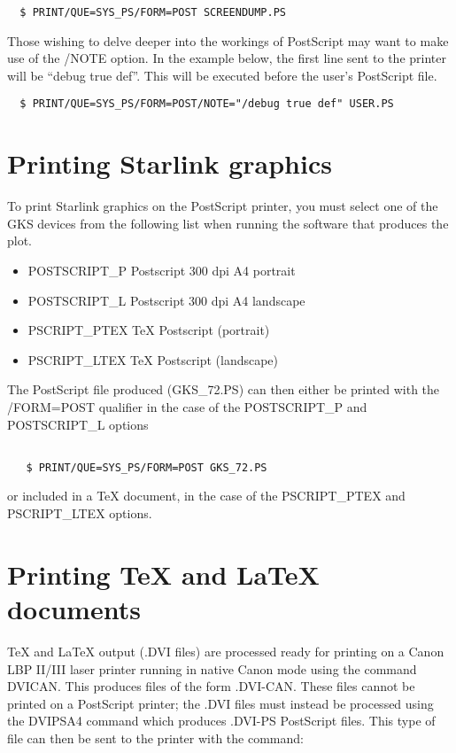 \begin{verbatim}
  $ PRINT/QUE=SYS_PS/FORM=POST SCREENDUMP.PS
\end{verbatim}

Those wishing to delve deeper into the workings of PostScript may want to
make use of the /NOTE option. In the example below, the first line sent to
the printer will be ``debug true def''. This will be executed before the
user's PostScript file.

\begin{verbatim}
  $ PRINT/QUE=SYS_PS/FORM=POST/NOTE="/debug true def" USER.PS
\end{verbatim}

\section{Printing Starlink graphics}

To print Starlink graphics on the PostScript printer, you must select
one of the GKS devices from the following list when running
the software that produces the plot.

\begin{itemize}
\item  POSTSCRIPT\_P    Postscript 300 dpi A4 portrait
\item  POSTSCRIPT\_L    Postscript 300 dpi A4 landscape
\item  PSCRIPT\_PTEX    TeX Postscript (portrait)
\item  PSCRIPT\_LTEX    TeX Postscript (landscape)
\end{itemize}

The PostScript file produced (GKS\_72.PS) can then either be printed with the
/FORM=POST qualifier in the case of the POSTSCRIPT\_P and POSTSCRIPT\_L
options

\begin{verbatim}

   $ PRINT/QUE=SYS_PS/FORM=POST GKS_72.PS

\end{verbatim}

or included in a \TeX\/ document, in the case of the PSCRIPT\_PTEX and
PSCRIPT\_LTEX options.


\section{Printing \TeX\/ and \LaTeX\/ documents}

\TeX\/ and \LaTeX \/ output (.DVI files) are processed ready for printing on a
Canon LBP II/III laser printer running in native Canon mode  using the command
DVICAN. This produces files of the form .DVI-CAN. These files cannot be printed
on a PostScript printer; the .DVI files must instead be processed using the
DVIPSA4 command which produces .DVI-PS PostScript files. This type of file can
then be sent to the printer with the command:

